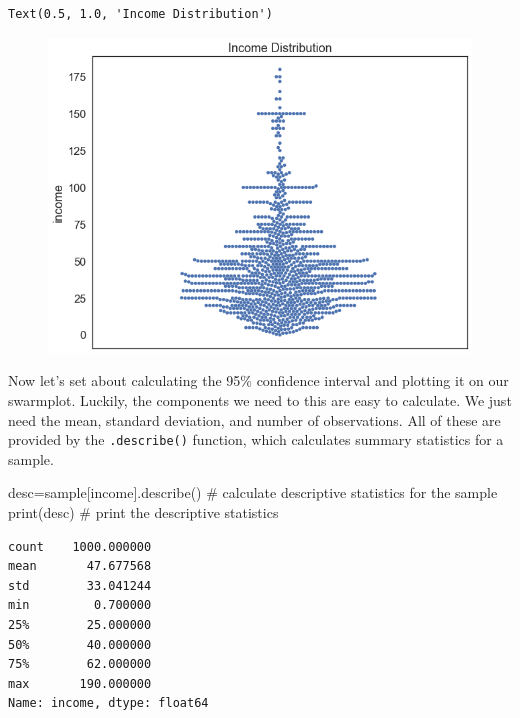 \documentclass[
  letterpaper,
  DIV=11,
  numbers=noendperiod]{scrreprt}
\newenvironment{Shaded}{\begin{snugshade}}{\end{snugshade}}
\newcommand{\BuiltInTok}[1]{\textcolor[rgb]{0.00,0.23,0.31}{#1}}
\newcommand{\CommentTok}[1]{\textcolor[rgb]{0.37,0.37,0.37}{#1}}
\newcommand{\NormalTok}[1]{\textcolor[rgb]{0.00,0.23,0.31}{#1}}
\newcommand{\OperatorTok}[1]{\textcolor[rgb]{0.37,0.37,0.37}{#1}}
\newcommand{\StringTok}[1]{\textcolor[rgb]{0.13,0.47,0.30}{#1}}
\begin{document}
\begin{verbatim}
Text(0.5, 1.0, 'Income Distribution')
\end{verbatim}

\begin{figure}[H]

{\centering \includegraphics{notebooks/W07. Hypothesis Testing_files/figure-pdf/cell-5-output-2.png}

}

\end{figure}

Now let's set about calculating the 95\% confidence interval and
plotting it on our swarmplot. Luckily, the components we need to this
are easy to calculate. We just need the mean, standard deviation, and
number of observations. All of these are provided by the
\texttt{.describe()} function, which calculates summary statistics for a
sample.

\begin{Shaded}
\begin{Highlighting}[]
\NormalTok{desc}\OperatorTok{=}\NormalTok{sample[}\StringTok{\textquotesingle{}income\textquotesingle{}}\NormalTok{].describe() }\CommentTok{\# calculate descriptive statistics for the sample}
\BuiltInTok{print}\NormalTok{(desc) }\CommentTok{\# print the descriptive statistics}
\end{Highlighting}
\end{Shaded}

\begin{verbatim}
count    1000.000000
mean       47.677568
std        33.041244
min         0.700000
25%        25.000000
50%        40.000000
75%        62.000000
max       190.000000
Name: income, dtype: float64
\end{verbatim}
\end{document}
